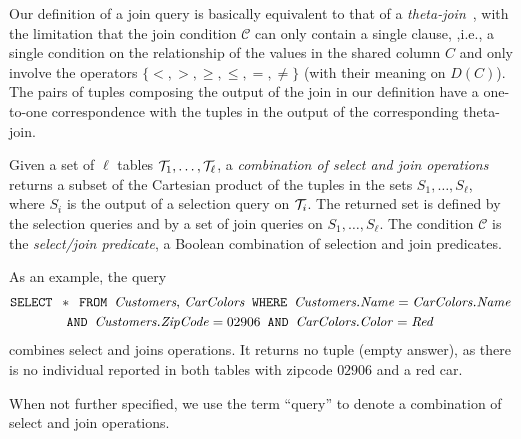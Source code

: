 Our definition of a join query is basically equivalent to that of a
\emph{theta-join}~\citep[Sect.5.2.7]{GarciaMolinaUW02}, with the limitation that
the join condition $\mathcal{C}$ can only contain a single clause, ,i.e., a single
condition on the relationship of the values in the shared column $C$ and only
involve the operators $\{<,>,\ge,\le,=,\neq\}$ (with their meaning on $D(C)$).
The pairs of tuples composing the output of the join in our definition have a
one-to-one correspondence with the tuples in the output of the corresponding
theta-join.

\begin{definition}\label{def:general query}
  Given a set of $\ell$ tables ${\cal T}_1,\dotsc,{\cal T}_\ell$, a \emph{combination of
  select and join operations} returns a subset of the Cartesian
  product of the tuples in the sets $S_1,\dotsc,S_\ell$, where $S_i$ is the
  output of a selection query on ${\cal T}_i$. The returned set is defined by the
  selection queries and by a set of join queries on $S_1,\dotsc,S_\ell$.
 The condition $\mathcal{C}$ is the \emph{select/join predicate}, a Boolean combination
  of selection and join predicates.
\end{definition}

As an example, the query 
\begin{align*}
\mbox{\texttt{SELECT }} &* \mbox{\texttt{ FROM }} \mbox{\emph{Customers},
\emph{CarColors}} \mbox{\texttt{ WHERE }} 
\mbox{\emph{Customers.Name}} = \mbox{\emph{CarColors.Name}} \\
& \mbox{\texttt{ AND }} \mbox{\emph{Customers.ZipCode}}=02906 \mbox{\texttt{ AND }} \mbox{\emph{CarColors.Color}}=\mbox{\emph{Red}}
\end{align*}
combines select and joins operations. It returns no tuple (empty answer), as
there is no individual reported in both tables with zipcode $02906$ and a red
car.

When not further specified, we use the term ``query'' to denote a combination of
select and join operations.

